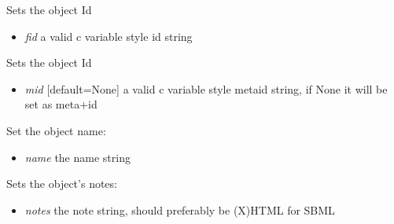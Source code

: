 \documentclass[a4paper,11pt,english]{sphinxmanual}
\begin{document}
\begin{fulllineitems}
\begin{fulllineitems}
\end{fulllineitems}


\begin{fulllineitems}
\label{modules_doc:cbmpy.CBModel.Fbase.setId}
Sets the object Id
\begin{itemize}
\item {} 
\emph{fid} a valid c variable style id string

\end{itemize}

\end{fulllineitems}


\begin{fulllineitems}
\label{modules_doc:cbmpy.CBModel.Fbase.setMetaId}
Sets the object Id
\begin{itemize}
\item {} 
\emph{mid} {[}default=None{]} a valid c variable style metaid string, if None it will be set as meta+id

\end{itemize}

\end{fulllineitems}


\begin{fulllineitems}
\label{modules_doc:cbmpy.CBModel.Fbase.setName}
Set the object name:
\begin{itemize}
\item {} 
\emph{name} the name string

\end{itemize}

\end{fulllineitems}


\begin{fulllineitems}
\label{modules_doc:cbmpy.CBModel.Fbase.setNotes}
Sets the object's notes:
\begin{itemize}
\item {} 
\emph{notes} the note string, should preferably be (X)HTML for SBML


\end{itemize}
\end{fulllineitems}
\end{fulllineitems}
\end{document}
